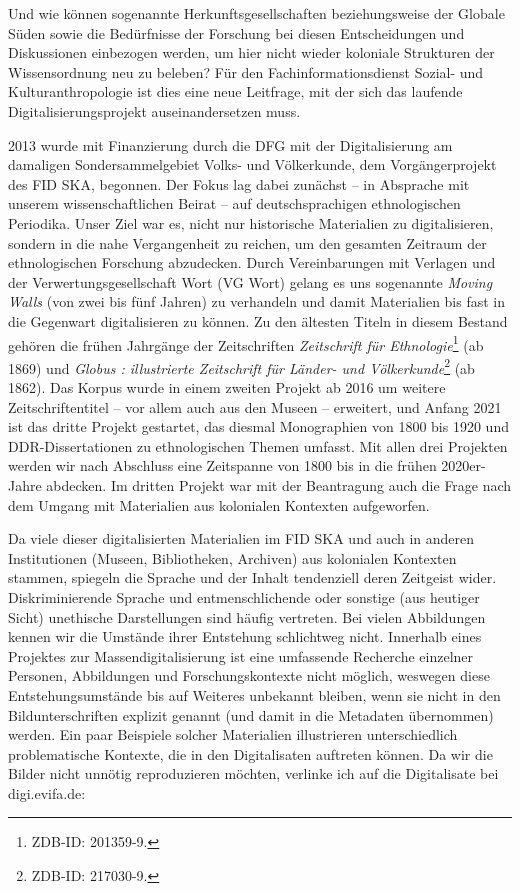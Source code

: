 \documentclass[a4paper,
fontsize=11pt,
oneside,
numbers=noperiodatend,
parskip=half-,
bibliography=totoc,
final
]{scrartcl}
\begin{document}
Und wie können sogenannte Herkunftsgesellschaften beziehungsweise der Globale Süden
sowie die Bedürfnisse der Forschung bei diesen Entscheidungen und
Diskussionen einbezogen werden, um hier nicht wieder koloniale
Strukturen der Wissensordnung neu zu beleben? Für den
Fachinformationsdienst Sozial- und Kulturanthropologie ist dies eine
neue Leitfrage, mit der sich das laufende Digitalisierungsprojekt
auseinandersetzen muss.

2013 wurde mit Finanzierung durch die DFG mit der Digitalisierung am
damaligen Sondersammelgebiet Volks- und Völkerkunde, dem
Vorgängerprojekt des FID SKA, begonnen. Der Fokus lag dabei zunächst --
in Absprache mit unserem wissenschaftlichen Beirat -- auf
deutschsprachigen ethnologischen Periodika. Unser Ziel war es, nicht nur
historische Materialien zu digitalisieren, sondern in die nahe
Vergangenheit zu reichen, um den gesamten Zeitraum der ethnologischen
Forschung abzudecken. Durch Vereinbarungen mit Verlagen und der
Verwertungsgesellschaft Wort (VG Wort) gelang es uns sogenannte
\emph{Moving Walls} (von zwei bis fünf Jahren) zu verhandeln und damit
Materialien bis fast in die Gegenwart digitalisieren zu können. Zu den
ältesten Titeln in diesem Bestand gehören die frühen Jahrgänge der
Zeitschriften \emph{Zeitschrift für Ethnologie}\footnote{ZDB-ID:
  201359-9.} (ab 1869) und \emph{Globus : illustrierte Zeitschrift für
Länder- und Völkerkunde}\footnote{ZDB-ID: 217030-9.} (ab 1862). Das
Korpus wurde in einem zweiten Projekt ab 2016 um weitere
Zeitschriftentitel -- vor allem auch aus den Museen -- erweitert, und
Anfang 2021 ist das dritte Projekt gestartet, das diesmal Monographien
von 1800 bis 1920 und DDR-Dissertationen zu ethnologischen Themen
umfasst. Mit allen drei Projekten werden wir nach Abschluss eine
Zeitspanne von 1800 bis in die frühen 2020er-Jahre abdecken. Im dritten
Projekt war mit der Beantragung auch die Frage nach dem Umgang mit
Materialien aus kolonialen Kontexten aufgeworfen.

Da viele dieser digitalisierten Materialien im FID SKA und auch in
anderen Institutionen (Museen, Bibliotheken, Archiven) aus kolonialen
Kontexten stammen, spiegeln die Sprache und der Inhalt tendenziell deren
Zeitgeist wider. Diskriminierende Sprache und entmenschlichende oder
sonstige (aus heutiger Sicht) unethische Darstellungen sind häufig
vertreten. Bei vielen Abbildungen kennen wir die Umstände ihrer
Entstehung schlichtweg nicht. Innerhalb eines Projektes zur
Massendigitalisierung ist eine umfassende Recherche einzelner Personen,
Abbildungen und Forschungskontexte nicht möglich, weswegen diese
Entstehungsumstände bis auf Weiteres unbekannt bleiben, wenn sie nicht
in den Bildunterschriften explizit genannt (und damit in die Metadaten
übernommen) werden. Ein paar Beispiele solcher Materialien illustrieren
unterschiedlich problematische Kontexte, die in den Digitalisaten
auftreten können. Da wir die Bilder nicht unnötig reproduzieren möchten,
verlinke ich auf die Digitalisate bei digi.evifa.de:
\end{document}

